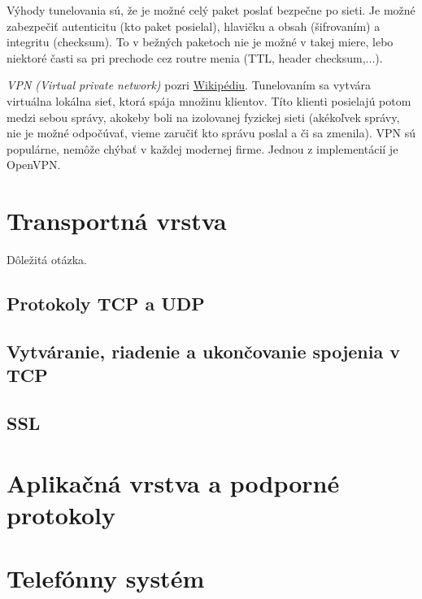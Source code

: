 \documentclass[10pt,a4paper]{article}
\begin{document}
Výhody tunelovania sú, že je možné celý paket poslať bezpečne po sieti. Je možné zabezpečiť autenticitu (kto paket posielal), hlavičku a obsah (šifrovaním) a integritu (checksum). 
To v bežných paketoch nie je možné v takej miere, lebo niektoré časti sa pri prechode cez routre menia (TTL, header checksum,...).  

\emph{VPN (Virtual private network)} pozri \href{http://en.wikipedia.org/wiki/Virtual_private_network}{Wikipédiu}.
Tunelovaním sa vytvára virtuálna lokálna sieť, ktorá spája množinu klientov. Títo klienti posielajú potom medzi sebou správy, akokeby boli na izolovanej fyzickej sieti (akékoľvek správy, nie je možné odpočúvať, vieme zaručiť kto správu poslal a či sa zmenila). 
VPN sú populárne, nemôže chýbať v každej modernej firme. 
Jednou z implementácií je OpenVPN. 
                                                           
\section{Transportná vrstva}       
Dôležitá otázka. 
   
\subsection{Protokoly TCP a UDP}   
\subsection{Vytváranie, riadenie a ukončovanie spojenia v TCP} 
\subsection{SSL}                             
\section{Aplikačná vrstva a podporné protokoly}            
\section{Telefónny systém}    
\end{document}
